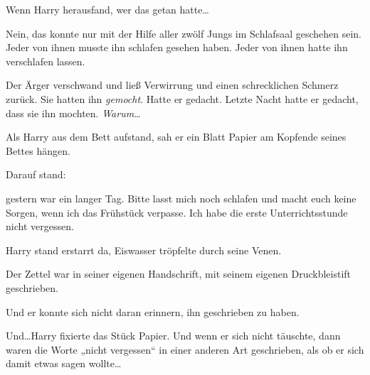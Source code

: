 Wenn Harry herausfand, wer das getan hatte…

Nein, das konnte nur mit der Hilfe aller zwölf Jungs im Schlafsaal geschehen sein. Jeder von ihnen musste ihn schlafen gesehen haben. Jeder von ihnen hatte ihn verschlafen lassen.

Der Ärger verschwand und ließ Verwirrung und einen schrecklichen Schmerz zurück. Sie hatten ihn \emph{gemocht}. Hatte er gedacht. Letzte Nacht hatte er gedacht, dass sie ihn mochten. \emph{Warum…}

Als Harry aus dem Bett aufstand, sah er ein Blatt Papier am Kopfende seines Bettes hängen.

Darauf stand:


\begin{writtenNote}

gestern war ein langer Tag. Bitte lasst mich noch schlafen und macht euch keine Sorgen, wenn ich das Frühstück verpasse. Ich habe die erste Unterrichtsstunde nicht vergessen.

\end{writtenNote}

Harry stand erstarrt da, Eiswasser tröpfelte durch seine Venen.

Der Zettel war in seiner eigenen Handschrift, mit seinem eigenen Druckbleistift geschrieben.

Und er konnte sich nicht daran erinnern, ihn geschrieben zu haben.

Und…Harry fixierte das Stück Papier. Und wenn er sich nicht täuschte, dann waren die Worte „nicht vergessen“ in einer anderen Art geschrieben, als ob er sich damit etwas sagen wollte…

